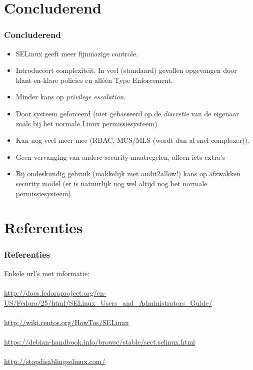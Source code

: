 \section{Concluderend}
\begin{styleframe}
    \frametitle{Concluderend}
\begin{itemize}
	\item SELinux geeft meer fijnmazige controle.
	\pause
	\item Introduceert complexiteit. In veel (standaard) gevallen opgevangen door klant-en-klare policies en all\'e\'en Type Enforcement.
	\pause
	\item Minder kans op {\it privilege escalation}.
	\pause
	\item Door systeem geforceerd (niet gebasseerd op de {\it discretie} van de eigenaar zoals bij het normale Linux permissiesysteem).
	\pause
	\item Kan nog veel meer mee (RBAC, MCS/MLS (wordt dan al snel complexer)).
	\pause
	\item Geen vervanging van andere security maatregelen, alleen iets extra's
	\pause
	\item Bij ondeskundig gebruik (makkelijk met audit2allow!) kans op afzwakken security model (er is natuurlijk nog wel altijd nog het normale permissiesysteem).
\end{itemize}
\end{styleframe}

\section{Referenties}
\begin{styleframe}
    \frametitle{Referenties}
Enkele url's met informatie: \\
~\\
\footnotesize
\url{http://docs.fedoraproject.org/en-US/Fedora/25/html/SELinux\_Users\_and\_Administrators\_Guide/}
~\\
~\\
\url{http://wiki.centos.org/HowTos/SELinux}
~\\
~\\
\url{https://debian-handbook.info/browse/stable/sect.selinux.html}
~\\
~\\
\url{http://stopdisablingselinux.com/}
\end{styleframe}
